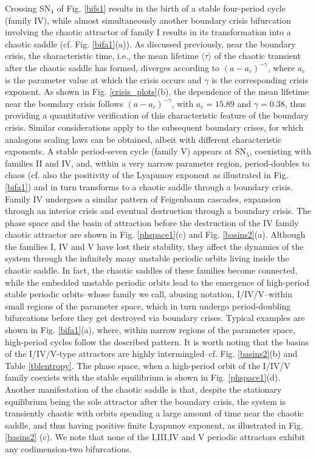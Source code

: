 \documentclass{article}
\theoremstyle{plain}
\theoremstyle{definition}
\begin{document}
Crossing SN$_4$ of Fig. \ref{bifs1} results in the birth of a stable four-period cycle (family IV), while almost simultaneously another boundary crisis bifurcation involving the chaotic attractor of family I results in its transformation into a chaotic saddle (cf. Fig. \ref{bifa1}(a)). As discussed previously, near the boundary crisis, the characteristic time, i.e., the mean lifetime $\langle \tau \rangle$ of the chaotic transient after the chaotic saddle has formed, diverges according to $(a-a_c)^{-\gamma}$, where $a_c$ is the parameter value at which the crisis occurs and $\gamma$ is the corresponding crisis exponent. As shown in Fig. \ref{crisis_plots}(b), the dependence of the mean lifetime near the boundary crisis follows $(a-a_c)^{-\gamma}$, with $a_c=15.89$ and $\gamma=0.38$, thus providing a quantitative verification of this characteristic feature of the boundary crisis. Similar considerations apply to the subsequent boundary crises, for which analogous scaling laws can be obtained, albeit with different characteristic exponents. A stable period-seven cycle (family V) appears at SN$_5$, coexisting with families II and IV, and, within a very narrow parameter region, period-doubles to chaos (cf. also the positivity of the Lyapunov exponent as illustrated in Fig. \ref{bifa1}) and in turn transforms to a chaotic saddle through a boundary crisis. Family IV undergoes a similar pattern of Feigenbaum cascades, expansion through an interior crisis and eventual destruction through a boundary crisis. The phase space and the basin of attraction before the destruction of the IV family chaotic attractor are shown in Fig. \ref{phspace1}(c) and Fig. \ref{basins2}(a). Although the families I, IV and V have lost their stability, they affect the dynamics of the system through the infinitely many unstable periodic orbits living inside the chaotic saddle. In fact, the chaotic saddles of these families become connected, while the embedded unstable periodic orbits lead to the emergence of high-period stable periodic orbits--whose family we call, abusing notation, I/IV/V--within small regions of the parameter space, which in turn undergo period-doubling bifurcations before they get destroyed via boundary crises. Typical examples are shown in Fig. \ref{bifa1}(a), where, within narrow regions of the parameter space, high-period cycles follow the described pattern. It is worth noting that the basins of the I/IV/V-type attractors are highly intermingled--cf. Fig. \ref{basins2}(b) and Table \ref{tblentropy}. The phase space, when a high-period orbit of the I/IV/V family coexists with the stable equilibrium is shown in Fig. \ref{phspace1}(d). Another manifestation of the chaotic saddle is that, despite the stationary equilibrium being the sole attractor after the boundary crisis, the system is transiently chaotic with orbits spending a large amount of time near the chaotic saddle, and thus having positive finite Lyapunov exponent, as illustrated in Fig. \ref{basins2} (c). We note that none of the I,III,IV and V periodic attractors exhibit any codimension-two bifurcations.
\end{document}
